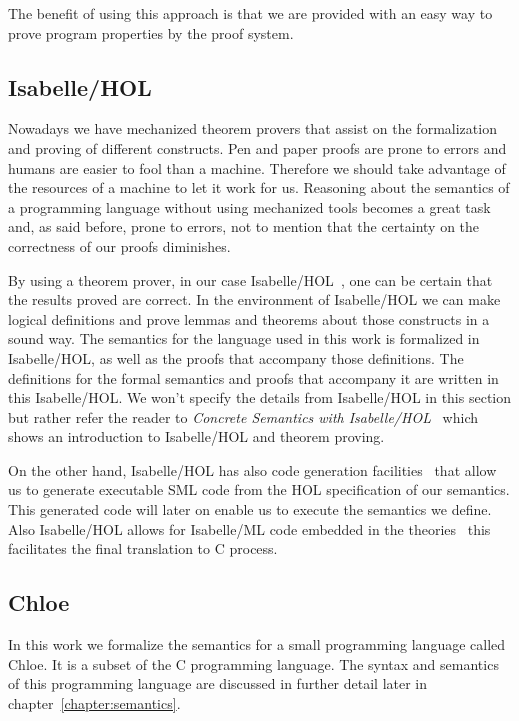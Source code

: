 The benefit of using this approach is that we are provided with an easy way to prove program properties by the proof system.


\subsection{Isabelle/HOL}\label{section:isabelle/hol}

Nowadays we have mechanized theorem provers that assist on the formalization and proving of different constructs.
Pen and paper proofs are prone to errors and humans are easier to fool than a machine.
Therefore we should take advantage of the resources of a machine to let it work for us.
Reasoning about the semantics of a programming language without using mechanized tools becomes a great task and, as said before, prone to errors, not to mention that the certainty on the correctness of our proofs diminishes.

By using a theorem prover, in our case Isabelle/HOL~\parencite{isabelle-tutorial}, one can be certain that the results proved are correct.
In the environment of Isabelle/HOL we can make logical definitions and prove lemmas and theorems about those constructs in a sound way.
The semantics for the language used in this work is formalized in Isabelle/HOL, as well as the proofs that accompany those definitions.
The definitions for the formal semantics and proofs that accompany it are written in this Isabelle/HOL.
We won't specify the details from Isabelle/HOL in this section but rather refer the reader to \textit{Concrete Semantics with Isabelle/HOL}~\parencite{nipkow} which shows an introduction to Isabelle/HOL and theorem proving.

On the other hand, Isabelle/HOL has also code generation facilities~\parencite{isabelle-codegen} that allow us to generate executable SML code from the HOL specification of our semantics.
This generated code will later on enable us to execute the semantics we define.
Also Isabelle/HOL allows for Isabelle/ML code embedded in the theories~\parencite{isabelle-implementation} this facilitates the final translation to C process.

\subsection{Chloe}\label{subsection:chloe}

In this work we formalize the semantics for a small programming language called Chloe.
It is a subset of the C programming language.
The syntax and semantics of this programming language are discussed in further detail later in chapter~\ref{chapter:semantics}.

